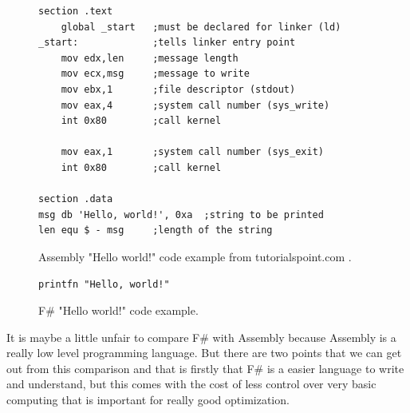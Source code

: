 \documentclass[12pt, a4paper]{article}
\begin{document}
\begin{figure}[!h]
	\begin{lstlisting}
section	.text
    global _start   ;must be declared for linker (ld)
_start:	            ;tells linker entry point
    mov	edx,len     ;message length
    mov	ecx,msg     ;message to write
    mov	ebx,1       ;file descriptor (stdout)
    mov	eax,4       ;system call number (sys_write)
    int	0x80        ;call kernel
	
    mov	eax,1       ;system call number (sys_exit)
    int	0x80        ;call kernel

section	.data
msg db 'Hello, world!', 0xa  ;string to be printed
len equ $ - msg     ;length of the string
	\end{lstlisting}
	\caption{Assembly "Hello world!" code example from tutorialspoint.com \cite{tutorialspoint}.}
	\label{fig:assemblyExample}
\end{figure}

\begin{figure}[!h]
	\begin{lstlisting}
printfn "Hello, world!"
	\end{lstlisting}
	\caption{F\# "Hello world!" code example.}
	\label{fig:fSharpHelloWorld}
\end{figure}

It is maybe a little unfair to compare F\# with Assembly because Assembly is a really low level programming language. But there are two points that we can get out from this comparison and that is firstly that F\# is a easier language to write and understand, but this comes with the cost of less control over very basic computing that is important for really good optimization.

\newpage




\end{document}
